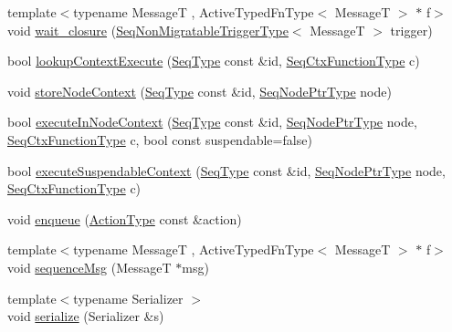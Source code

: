 \begin{DoxyCompactItemize}
\item 
{\footnotesize template$<$typename MessageT , Active\+Typed\+Fn\+Type$<$ Message\+T $>$ $\ast$ f$>$ }\\void \hyperlink{structvt_1_1seq_1_1_tagged_sequencer_ac1ba35f793dcb35a47d4e73ec6ab29d4}{wait\+\_\+closure} (\hyperlink{namespacevt_1_1seq_aa88b0d93284d188be39704024ab58b8f}{Seq\+Non\+Migratable\+Trigger\+Type}$<$ MessageT $>$ trigger)
\item 
bool \hyperlink{structvt_1_1seq_1_1_tagged_sequencer_aacd0771ce78276cd9385f5ca742fe099}{lookup\+Context\+Execute} (\hyperlink{structvt_1_1seq_1_1_tagged_sequencer_a1c8ee839258d0f88c49ef660267a81d5}{Seq\+Type} const \&id, \hyperlink{structvt_1_1seq_1_1_tagged_sequencer_ad8a1ed9b8c012cf2a73ebd2e46d6d899}{Seq\+Ctx\+Function\+Type} c)
\item 
void \hyperlink{structvt_1_1seq_1_1_tagged_sequencer_a580a0fd2ced16f447351f142f1438e42}{store\+Node\+Context} (\hyperlink{structvt_1_1seq_1_1_tagged_sequencer_a1c8ee839258d0f88c49ef660267a81d5}{Seq\+Type} const \&id, \hyperlink{namespacevt_1_1seq_ae6a4874b585be0612aaca32ca6d2d191}{Seq\+Node\+Ptr\+Type} node)
\item 
bool \hyperlink{structvt_1_1seq_1_1_tagged_sequencer_a22ec2d429c99ca4d34a6b1b0c95c658f}{execute\+In\+Node\+Context} (\hyperlink{structvt_1_1seq_1_1_tagged_sequencer_a1c8ee839258d0f88c49ef660267a81d5}{Seq\+Type} const \&id, \hyperlink{namespacevt_1_1seq_ae6a4874b585be0612aaca32ca6d2d191}{Seq\+Node\+Ptr\+Type} node, \hyperlink{structvt_1_1seq_1_1_tagged_sequencer_ad8a1ed9b8c012cf2a73ebd2e46d6d899}{Seq\+Ctx\+Function\+Type} c, bool const suspendable=false)
\item 
bool \hyperlink{structvt_1_1seq_1_1_tagged_sequencer_a7cabb68c124d242fca8c9dcb6fc51ec9}{execute\+Suspendable\+Context} (\hyperlink{structvt_1_1seq_1_1_tagged_sequencer_a1c8ee839258d0f88c49ef660267a81d5}{Seq\+Type} const \&id, \hyperlink{namespacevt_1_1seq_ae6a4874b585be0612aaca32ca6d2d191}{Seq\+Node\+Ptr\+Type} node, \hyperlink{structvt_1_1seq_1_1_tagged_sequencer_ad8a1ed9b8c012cf2a73ebd2e46d6d899}{Seq\+Ctx\+Function\+Type} c)
\item 
void \hyperlink{structvt_1_1seq_1_1_tagged_sequencer_a6c8c19a264be5d59d0abdbc31c8d6df8}{enqueue} (\hyperlink{namespacevt_ae0a5a7b18cc99d7b732cb4d44f46b0f3}{Action\+Type} const \&action)
\item 
{\footnotesize template$<$typename MessageT , Active\+Typed\+Fn\+Type$<$ Message\+T $>$ $\ast$ f$>$ }\\void \hyperlink{structvt_1_1seq_1_1_tagged_sequencer_a51470994cb625a098a7ebb9ccc489ec7}{sequence\+Msg} (MessageT $\ast$msg)
\item 
{\footnotesize template$<$typename Serializer $>$ }\\void \hyperlink{structvt_1_1seq_1_1_tagged_sequencer_af8435102a5cd70ef37d12ac261d65211}{serialize} (Serializer \&s)
\end{DoxyCompactItemize}
